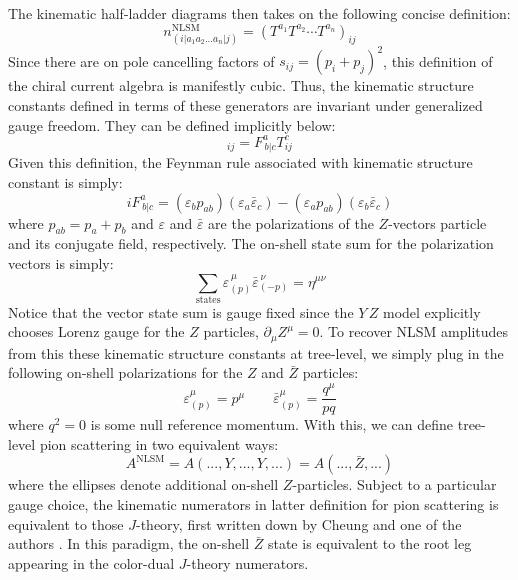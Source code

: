 \documentclass[11pt,letter]{article}
\def\be{\begin{equation}}
\begin{document}
The kinematic half-ladder diagrams then takes on the following concise definition:
\begin{equation}
n^{\text{NLSM}}_{(i|a_1a_2...a_n|j)} = (T^{a_1}T^{a_2}\cdots T^{a_n})_{ij}
\end{equation}
Since there are on pole cancelling factors of $s_{ij} = (p_i+p_j)^2$, this definition of the chiral current algebra is manifestly cubic. Thus, the kinematic structure constants defined in terms of these generators are invariant under generalized gauge freedom. They can be defined implicitly below:
\begin{equation}
[T^a,T^b]_{ij}= F^{a}_{\,b|c}T^c_{ij}
\end{equation}
Given this definition, the Feynman rule associated with kinematic structure constant is simply:
\be\label{eq:FeynmanRuleXZZ}
i F^{a}_{\,b|c} = (\varepsilon_b p_{ab})(\varepsilon_a\bar{\varepsilon}_c) - (\varepsilon_a p_{ab})(\varepsilon_b\bar{\varepsilon}_c) 
\end{equation}
where $p_{ab}=p_a+p_b$ and $\varepsilon$ and $\bar{\varepsilon}$ are the polarizations of the $Z$-vectors particle and its conjugate field, respectively. The on-shell state sum for the polarization vectors is simply:
\begin{equation}
\sum_{\text{states}} \varepsilon^{\,\mu}_{(p)}\bar{\varepsilon}^{\,\nu}_{(-p)} = \eta^{\mu\nu}
\end{equation}
Notice that the vector state sum is gauge fixed since the $Y\,Z$ model explicitly chooses Lorenz gauge for the $Z$ particles, $\partial_\mu Z^\mu=0$. To recover NLSM amplitudes from this these kinematic structure constants at tree-level, we simply plug in the following on-shell polarizations for the $Z$ and $\bar{Z}$ particles:
\be\label{eq:onShellZStates}
\varepsilon^\mu_{(p)} = p^\mu \qquad \bar{\varepsilon}^\mu_{(p)} = \frac{q^\mu}{pq}
\end{equation}
where $q^2=0$ is some null reference momentum. With this, we can define tree-level pion scattering in two equivalent ways:
\begin{equation}
A^{\text{NLSM}} = A(...,Y,...,Y,...) = A(...,\bar{Z},...) 
\end{equation}
where the ellipses denote additional on-shell $Z$-particles. Subject to a particular gauge choice, the kinematic numerators in latter definition for pion scattering is equivalent to those $J$-theory, first written down by Cheung and one of the authors \cite{Cheung:2021zvb}. In this paradigm, the on-shell $\bar{Z}$ state is equivalent to the root leg appearing in the color-dual $J$-theory numerators. 
\end{document}
